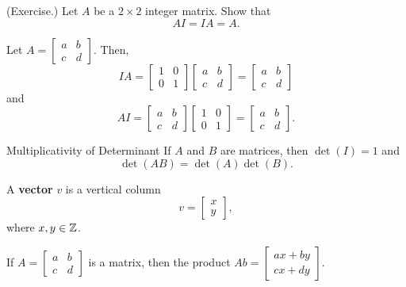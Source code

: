 \documentclass[letterpaper]{article}
\newcommand{\0}{\mathbf{0}}
\begin{document}
\begin{mdframed}
    (Exercise.) Let $A$ be a $2 \times 2$ integer matrix. Show that \[AI = IA = A.\]

    \begin{mdframed}
        Let $A = \begin{bmatrix}
            a & b \\ 
            c & d
        \end{bmatrix}.$ Then, 
        \[IA = \begin{bmatrix}
            1 & 0 \\ 
            0 & 1
        \end{bmatrix} \begin{bmatrix}
            a & b \\ 
            c & d
        \end{bmatrix} = \begin{bmatrix}
            a & b \\ 
            c & d
        \end{bmatrix}\]
        and 
        \[AI = \begin{bmatrix}
            a & b \\ 
            c & d
        \end{bmatrix} \begin{bmatrix}
            1 & 0 \\ 
            0 & 1
        \end{bmatrix} = \begin{bmatrix}
            a & b \\ 
            c & d
        \end{bmatrix}.\]
    \end{mdframed}
\end{mdframed}

\begin{theorem}{Multiplicativity of Determinant}{}
    If $A$ and $B$ are matrices, then $\det(I) = 1$ and \[\det(AB) = \det(A)\det(B).\]
\end{theorem}

\begin{definition}{}{}
    A \textbf{vector} $v$ is a vertical column \[v = \begin{bmatrix}
        x \\ y
    \end{bmatrix},\] where $x, y \in \mathbb{Z}$. 
\end{definition}

\begin{definition}{}{}
    If $A = \begin{bmatrix}
        a & b \\ c & d
    \end{bmatrix}$ is a matrix, then the product $Ab = \begin{bmatrix}
        ax + by \\ 
        cx + dy
    \end{bmatrix}$.
\end{definition}
\end{document}
